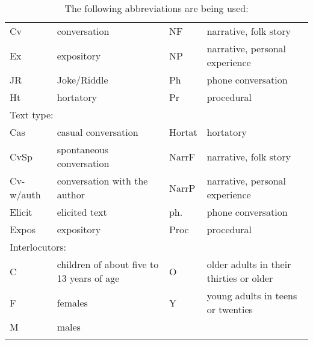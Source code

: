 \begin{table}
\caption{The following abbreviations are being used:}

\setlength{\parindent}{0pt}
\begin{tabularx}{\textwidth}{lXlX}
	\lsptoprule
\multicolumn{4}{l}{File name:} \\\midrule
Cv & conversation & NF & narrative, folk story \\ Ex & expository & NP & narrative, personal experience \\ JR & Joke/Riddle & Ph & phone conversation \\ Ht & hortatory & Pr & procedural\\\midrule

\multicolumn{4}{l}{Text type:}\\\midrule
Cas & casual conversation & Hortat & hortatory \\ CvSp & spontaneous conversation & NarrF & narrative, folk story \\ Cv-w/auth & conversation with the author& NarrP & narrative, personal experience \\ Elicit & elicited text & ph. & phone conversation \\ Expos & expository & Proc & procedural\\\midrule

\multicolumn{4}{l}{Interlocutors:}\\\midrule C & children of about five to 13 years of age & O & older adults in their thirties or older \\ F & females & Y & young adults in teens or twenties \\ M & males\\
\lspbottomrule
\end{tabularx}
\end{table}
\pagebreak
